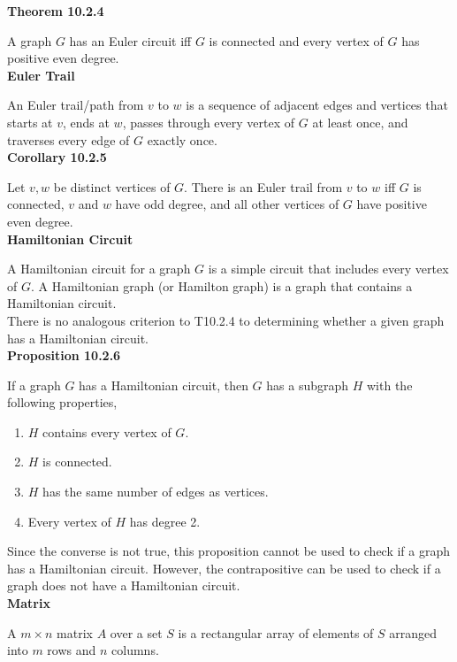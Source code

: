 \documentclass[a4paper]{article}
\newcommand{\subheading}[1]{{\scriptsize\textbf{#1}}}
\begin{document}
\begin{multicols*}{4}
\subheading{Theorem 10.2.4}

A graph $G$ has an Euler circuit iff $G$ is connected and every vertex of $G$
has positive even degree.\\

\subheading{Euler Trail}

An Euler trail/path from $v$ to $w$ is a sequence of adjacent edges and
vertices that starts at $v$, ends at $w$, passes through every vertex of $G$ at
least once, and traverses every edge of $G$ exactly once.\\

\subheading{Corollary 10.2.5}

Let $v, w$ be distinct vertices of $G$. There is an Euler trail from $v$ to $w$
iff $G$ is connected, $v$ and $w$ have odd degree, and all other vertices of
$G$ have positive even degree.\\

\subheading{Hamiltonian Circuit}

A Hamiltonian circuit for a graph $G$ is a simple circuit that includes every
vertex of $G$. A Hamiltonian graph (or Hamilton graph) is a graph that contains
a Hamiltonian circuit.\\

There is no analogous criterion to T10.2.4 to determining whether a given graph
has a Hamiltonian circuit.\\

\subheading{Proposition 10.2.6}

If a graph $G$ has a Hamiltonian circuit, then $G$ has a subgraph $H$ with the
following properties,
\begin{enumerate} \itemsep -0.5em
 \item $H$ contains every vertex of $G$.
 \item $H$ is connected.
 \item $H$ has the same number of edges as vertices.
 \item Every vertex of $H$ has degree 2.
\end{enumerate}
Since the converse is not true, this proposition cannot be used to check if a
graph has a Hamiltonian circuit. However, the contrapositive can be used to
check if a graph does not have a Hamiltonian circuit.\\

\subheading{Matrix}

A $m \times n$ matrix $A$ over a set $S$ is a rectangular array of elements of
$S$ arranged into $m$ rows and $n$ columns.\\


\end{multicols*}
\end{document}
